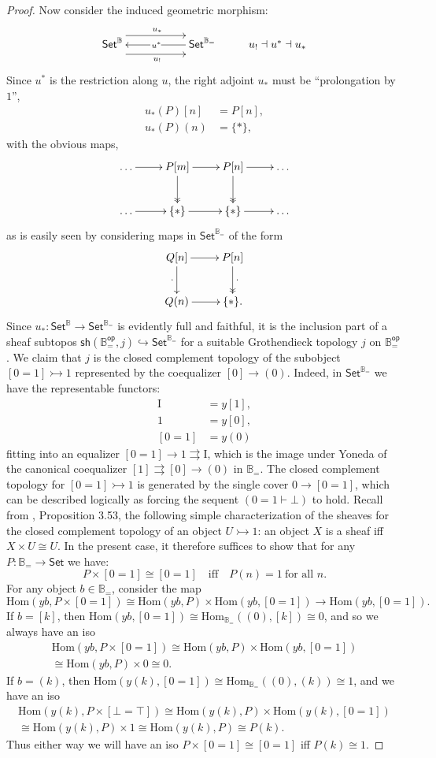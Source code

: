 \documentclass[11pt,reqno]{amsart}
\newcommand{\B}{\ensuremath{\mathbb{B}}}
\newcommand{\Set}{\ensuremath{\mathsf{Set}}}
\newcommand{\hook}{\ensuremath{\hookrightarrow}}
\newcommand{\mono}{\ensuremath{\rightarrowtail}}
\renewcommand{\to}{\ensuremath{\rightarrow}}
\renewcommand{\hom}{\ensuremath{\mathrm{Hom}}}
\newcommand{\I}{\ensuremath{\mathrm{I}}}
\theoremstyle{remark}
\theoremstyle{definition}
\begin{document}
\begin{proof}
Now consider the induced geometric morphism:
\[
\xymatrix{
\Set^\B \ar@<-2ex>[rr]_{u_!} \ar@<2ex>[rr]^{u_*} && \ar[ll]|-{\,u^*} \Set^{\B_=}  & u_! \dashv u^* \dashv u_*
}
\]
Since $u^*$ is the restriction along $u$, the right adjoint $u_*$ must be ``prolongation by $1$'',
\begin{align*}
u_*(P)[n] &= P[n],\\
u_*(P)(n) &= \{*\},
\end{align*}
with the obvious maps,
\[
\xymatrix{
\dots \ar[r] & P[m] \ar@{->>}[d] \ar[r] & P[n] \ar@{->>}[d] \ar[r] & \dots \\
\dots \ar[r] & \{*\} \ar[r] & \{*\} \ar[r] & \dots
}
\]
as is easily seen by considering maps in $\Set^{\B_=}$ of the form
\[
\xymatrix{
 Q[n] \ar[d]_{\cdot} \ar[r] & P[n] \ar@{->>}[d]^{\cdot} \\
 Q(n) \ar[r]^{} & \{*\} .
}
\]
Since $u_* : \Set^{\B} \to \Set^{\B_=}$ is evidently full and faithful, it is the inclusion part of a sheaf subtopos $\mathsf{sh}(\B^\mathsf{op}_=, j) \hook \Set^{\B_=}$ for a suitable Grothendieck topology $j$ on $\B^\mathsf{op}_=$.  We claim that $j$ is the closed complement topology of the subobject $[0 = 1] \rightarrowtail 1$ represented by the coequalizer $[0]\to (0)$.  Indeed, in $\Set^{\B_=}$ we have the representable functors:
\begin{align*}
\I &= y[1],\\
1 &= y[0],\\
[0=1] &= y(0)
\end{align*}
fitting into an equalizer $[0=1] \to 1 \rightrightarrows \I$, which is the image under Yoneda of the canonical coequalizer $[1] \rightrightarrows [0]\to (0)$ in $\B_=$.  The closed complement topology for $[0=1] \mono 1$ is generated by the single cover $0\to [0=1]$, which can be described logically as 
forcing the sequent $(0=1 \vdash \bot)$ to hold.  Recall from \cite{JohnstoneTT}, Proposition 3.53, the following simple characterization of the sheaves for the closed complement topology of an object $U\mono 1$: an object $X$ is a sheaf iff $X\times U \cong U$. In the present case, it therefore suffices to show that for any $P:\B_= \to \Set$ we have:
\[
P\times [0=1] \cong [0=1] \quad\text{iff}\quad P(n) = 1\ \text{for all $n$}.
\]
For any object $b\in \B_=$, consider the map
\[
\hom(yb, P\times [0=1] ) \cong \hom(yb, P) \times \hom(yb, [0=1]) \to \hom(yb, [0=1]) .
\]
If $b = [k]$, then $\hom(yb, [0 = 1]) \cong \hom_{\B_=}((0), [k]) \cong 0$, and so we always have an iso
\[
\begin{split}
\hom(yb, P\times [0 = 1] ) \cong \hom(yb, P) \times \hom(yb, [0=1])\\
 \cong \hom(yb, P) \times 0 \cong 0.
 \end{split}
\]
If $b = (k)$, then $\hom(y(k), [0=1]) \cong \hom_{\B_=}((0), (k)) \cong 1$, and we have an iso
\[
\begin{split}
\hom(y(k), P\times [\bot=\top] ) \cong \hom(y(k), P) \times \hom(y(k), [0=1]) \\
\cong \hom(y(k), P) \times 1 \cong \hom(y(k), P) \cong P(k).
\end{split}
\]
Thus either way we will have an iso $P\times [0=1] \cong [0=1]$ iff $P(k) \cong 1$.


\end{proof}
\end{document}
